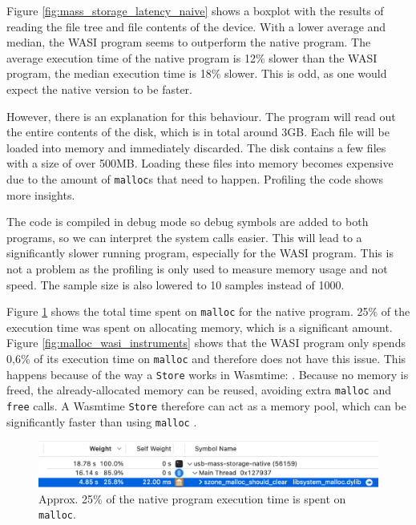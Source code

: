 Figure \ref{fig:mass_storage_latency_naive} shows a boxplot with the results of reading the file tree and file contents of the device. With a lower average and median, the \acrshort{WASI} program seems to outperform the native program. The average execution time of the native program is 12\% slower than the \acrshort{WASI} program, the median execution time is 18\% slower. This is odd, as one would expect the native version to be faster.

However, there is an explanation for this behaviour. The program will read out the entire contents of the disk, which is in total around 3GB. Each file will be loaded into memory and immediately discarded. The disk contains a few files with a size of over 500MB. Loading these files into memory becomes expensive due to the amount of \texttt{malloc}s that need to happen. Profiling the code shows more insights.

The code is compiled in debug mode so debug symbols are added to both programs, so we can interpret the system calls easier. This will lead to a significantly slower running program, especially for the \acrshort{WASI} program. This is not a problem as the profiling is only used to measure memory usage and not speed. The sample size is also lowered to 10 samples instead of 1000.

Figure \ref{fig:malloc_instruments} shows the total time spent on \texttt{malloc} for the native program. 25\% of the execution time was spent on allocating memory, which is a significant amount. Figure \ref{fig:malloc_wasi_instruments} shows that the \acrshort{WASI} program only spends 0,6\% of its execution time on \texttt{malloc} and therefore does not have this issue. This happens because of the way a \texttt{Store} works in Wasmtime:  \cite{wasmtime_store}. Because no memory is freed, the already-allocated memory can be reused, avoiding extra \texttt{malloc} and \texttt{free} calls. A Wasmtime \texttt{Store} therefore can act as a memory pool, which can be significantly faster than using \texttt{malloc} \cite{memory_pool_wikipedia}.


\begin{figure}[H]
  \centering
  \includegraphics[width=1\textwidth]{images/malloc_screenshot.png}
  \caption{Approx. 25\% of the native program execution time is spent on \texttt{malloc}.}
  \label{fig:malloc_instruments}
\end{figure}

